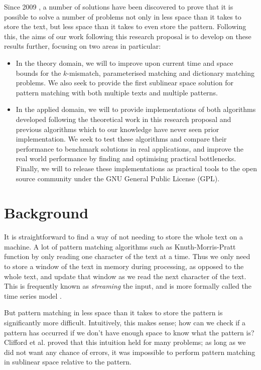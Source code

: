 \documentclass[a4paper,11pt]{article}
\begin{document}
    Since 2009 \cite{5438620}, a number of solutions have been discovered to prove that it is possible to solve a number of problems not only in less space than it takes to store the text, but less space than it takes to even store the pattern. Following this, the aims of our work following this research proposal is to develop on these results further, focusing on two areas in particular:

    \begin{itemize}
        \item In the theory domain, we will to improve upon current time and space bounds for the $k$-mismatch, parameterised matching and dictionary matching problems. We also seek to provide the first sublinear space solution for pattern matching with both multiple texts and multiple patterns.
        \item In the applied domain, we will to provide implementations of both algorithms developed following the theoretical work in this research proposal and previous algorithms which to our knowledge have never seen prior implementation. We seek to test these algorithms and compare their performance to benchmark solutions in real applications, and improve the real world performance by finding and optimising practical bottlenecks. Finally, we will to release these implementations as practical tools to the open source community under the GNU General Public License (GPL).
    \end{itemize}

    \section{Background}

    It is straightforward to find a way of not needing to store the whole text on a machine. A lot of pattern matching algorithms such as Knuth-Morris-Pratt \cite{kmp} function by only reading one character of the text at a time. Thus we only need to store a window of the text in memory during processing, as opposed to the whole text, and update that window as we read the next character of the text. This is frequently known as \textit{streaming} the input, and is more formally called the time series model \cite{TCS-002}.

    But pattern matching in less space than it takes to store the pattern is significantly more difficult. Intuitively, this makes sense; how can we check if a pattern has occurred if we don't have enough space to know what the pattern is? Clifford et al.\@ \cite{clifford:black-box} proved that this intuition held for many problems; as long as we did not want any chance of errors, it was impossible to perform pattern matching in sublinear space relative to the pattern.
\end{document}
